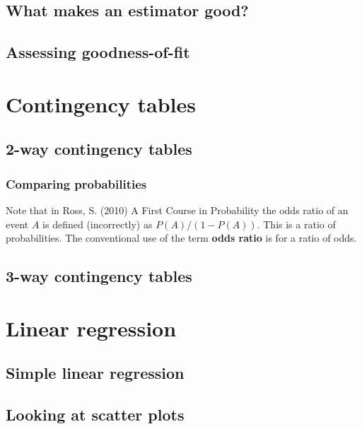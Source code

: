\documentclass[
  11pt,
  british,
  openany, a4paper]{book}
\begin{document}
\hypertarget{good}{%
\section{What makes an estimator good?}\label{good}}

\hypertarget{assessing-goodness-of-fit}{%
\section{Assessing goodness-of-fit}\label{assessing-goodness-of-fit}}

\hypertarget{contingency}{%
\chapter{Contingency tables}\label{contingency}}

\hypertarget{way2}{%
\section{2-way contingency tables}\label{way2}}

\hypertarget{comparing-probabilities}{%
\subsection{Comparing probabilities}\label{comparing-probabilities}}

Note that in Ross, S. (2010) A First Course in Probability the odds ratio of an event \(A\) is defined (incorrectly) as \(P(A) / (1 - P(A))\). This is a ratio of probabilities. The conventional use of the term \textbf{odds ratio} is for a ratio of odds.

\hypertarget{way3}{%
\section{3-way contingency tables}\label{way3}}

\hypertarget{linreg}{%
\chapter{Linear regression}\label{linreg}}

\hypertarget{simple-linear-regression}{%
\section{Simple linear regression}\label{simple-linear-regression}}

\hypertarget{looking-at-scatter-plots}{%
\section{Looking at scatter plots}\label{looking-at-scatter-plots}}
\end{document}
